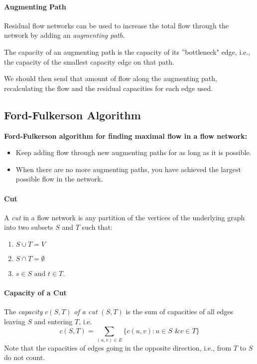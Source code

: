 \paragraph{Augmenting Path} 
Residual flow networks can be used to increase the total flow through the network
by adding an \textit{augmenting path}.

The capacity of an augmenting path is the capacity of its ''bottleneck"
edge, i.e., the capacity of the smallest capacity edge on that path.

We should then send that amount of flow along the augmenting path, recalculating
the flow and the residual capacities for each edge used.

\subsection{Ford-Fulkerson Algorithm}
\textbf{Ford-Fulkerson algorithm for finding maximal flow in a flow network:}
\begin{itemize}
    \item Keep adding flow through new augmenting paths for as long as it is possible.
    \item When there are no more augmenting paths, you have achieved the largest 
    possible flow in the network.
\end{itemize}

\paragraph{Cut}
A \textit{cut} in a flow network is any partition of the vertices of the underlying 
graph into two subsets \(S\) and \(T\) such that:
\begin{enumerate}
    \item \(S \cup T = V\)
    \item \(S \cap T = \emptyset\)
    \item \(s \in S \text{ and } t \in T\).
\end{enumerate}

\paragraph{Capacity of a Cut}
The \textit{capacity} \(c(S,T)\) \textit{of a cut} \((S, T)\) is the sum of capacities
of all edges leaving \(S\) and entering \(T\), i.e.
\[c(S,T) = \sum_{(u,v) \in E} \{c(u,v):u\in S \text{ \& } v \in T\}\]
Note that the capacities of edges going in the opposite direction, i.e., from \(T\)
to \(S\) do not count.

